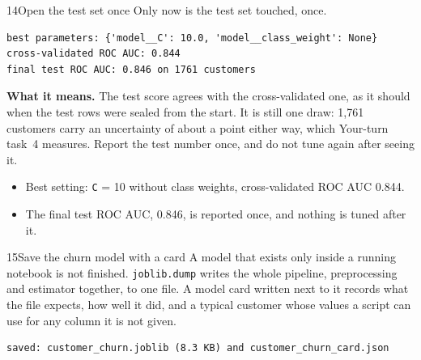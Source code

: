 \begin{labquestion}{14}{Open the test set once}
Only now is the test set touched, once.
\end{labquestion}
\begin{labanswer}

\begin{refoutput}
\begin{lstlisting}[style=utpterminal]
best parameters: {'model__C': 10.0, 'model__class_weight': None}
cross-validated ROC AUC: 0.844
final test ROC AUC: 0.846 on 1761 customers
\end{lstlisting}
\end{refoutput}

\textbf{What it means.} The test score agrees with the cross-validated one, as it should when the test rows were sealed from the start. It is still one draw: 1,761 customers carry an uncertainty of about a point either way, which Your-turn task~4 measures. Report the test number once, and do not tune again after seeing it.
\end{labanswer}



\begin{labcheckpoint}
\begin{itemize}[leftmargin=1.2em,itemsep=2pt,topsep=1pt]
  \item Best setting: \texttt{C} = 10 without class weights, cross-validated ROC AUC 0.844.
  \item The final test ROC AUC, 0.846, is reported once, and nothing is tuned after it.
\end{itemize}
\end{labcheckpoint}


\begin{labquestion}{15}{Save the churn model with a card}
A model that exists only inside a running notebook is not finished. \texttt{joblib.dump} writes the whole pipeline, preprocessing and estimator together, to one file. A model card written next to it records what the file expects, how well it did, and a typical customer whose values a script can use for any column it is not given.
\end{labquestion}
\begin{labanswer}

\begin{refoutput}
\begin{lstlisting}[style=utpterminal]
saved: customer_churn.joblib (8.3 KB) and customer_churn_card.json
\end{lstlisting}
\end{refoutput}
\end{labanswer}

